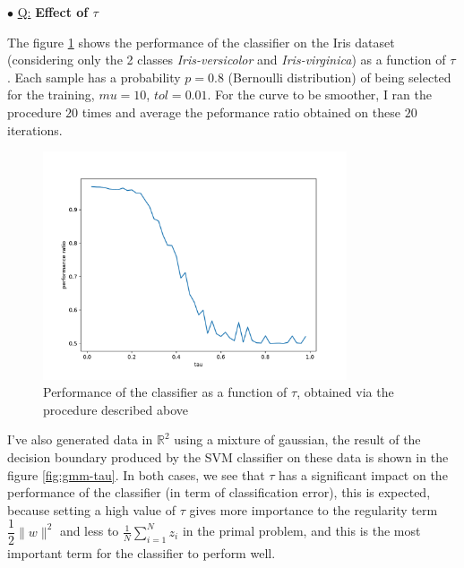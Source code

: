 \documentclass[a4paper, 11pt]{article}
\newcounter{cquestion}[subsection]
\renewcommand{\thecquestion}{\arabic{cquestion}}
\newenvironment{question}
{\par \vspace{0.5em} \noindent \stepcounter{cquestion} \hspace{-1em}
 $\bullet$ \underline{Q\thecquestion :}}
{}
\newcommand{\name}[1]{\emph{#1}}
\newcommand{\norm}[1]{\|#1\|}
\newcommand{\ipart}[1]{\vspace{0.5em}\textbf{#1}\vspace{0.5em}}
\begin{document}
\begin{question}
  \ipart{Effect of $\tau$}

  The figure \ref{fig:iris-tau} shows the performance of the
  classifier on the Iris dataset (considering only the 2 classes
  \name{Iris-versicolor} and \name{Iris-virginica}) as a function of
  $\tau$. Each sample has a probability $p = 0.8$ (Bernoulli
  distribution) of being selected for the training, $mu = 10$,
  $tol = 0.01$. For the curve to be smoother, I ran the procedure $20$
  times and average the peformance ratio obtained on these $20$
  iterations.

  \begin{figure}[h]
    \centering
    \includegraphics[width=0.8\textwidth]{iris_tau.pdf}
    \caption{Performance of the classifier as a function of $\tau$,
      obtained via the procedure described above}\label{fig:iris-tau}
  \end{figure}

  I've also generated data in $\mathbb{R}^2$ using a mixture of
  gaussian, the result of the decision boundary produced by the SVM
  classifier on these data is shown in the figure \ref{fig:gmm-tau}.
  In both cases, we see that $\tau$ has a significant impact on the
  performance of the classifier (in term of classification error),
  this is expected, because setting a high value of $\tau$ gives more
  importance to the regularity term $\dfrac{1}{2}\norm{w}^2$ and less
  to $\frac{1}{N}\sum_{i = 1}^Nz_i$ in the primal problem, and this is
  the most important term for the classifier to perform well.


\end{question}
\end{document}
